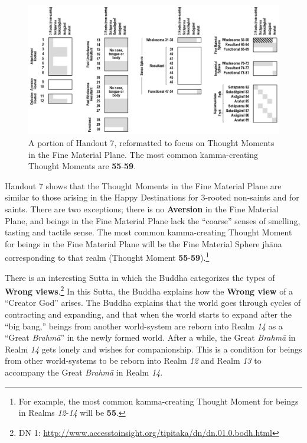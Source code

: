 \pagebreak

\begin{figure}[h]
\centering
\includegraphics[width=1\linewidth]{./Diagrams/Fine}
\caption{A portion of Handout 7, reformatted to focus on Thought Moments in the Fine Material Plane. The most common kamma-creating Thought Moments are \textbf{55}-\textbf{59}.}
\label{fig:Fine}
\end{figure}

Handout 7 shows that the Thought Moments in the Fine Material Plane are similar to those arising in the Happy Destinations for 3-rooted non-saints and for saints. There are two exceptions; there is no \textbf{Aversion} in the Fine Material Plane, and beings in the Fine Material Plane lack the “coarse” senses of smelling, tasting and tactile sense. The most common kamma-creating Thought Moment for beings in the Fine Material Plane will be the Fine Material Sphere jhāna corresponding to that realm (Thought Moment \textbf{55}-\textbf{59}).\footnote{For example, the most common kamma-creating Thought Moment for beings in Realms \textit{12}-\textit{14} will be \textbf{55}.}

There is an interesting Sutta in which the Buddha categorizes the types of \textbf{Wrong views}.\footnote{DN 1: \url{http://www.accesstoinsight.org/tipitaka/dn/dn.01.0.bodh.html}} In this Sutta, the Buddha explains how the \textbf{Wrong view} of a “Creator God” arises. The Buddha explains that the world goes through cycles of contracting and expanding, and that when the world starts to expand after the “big bang,” beings from another world-system are reborn into Realm \textit{14} as a “Great \textit{Brahmā}” in the newly formed world. After a while, the Great \textit{Brahmā} in Realm \textit{14} gets lonely and wishes for companionship. This is a condition for beings from other world-systems to be reborn into Realm \textit{12} and Realm \textit{13} to accompany the Great \textit{Brahmā} in Realm \textit{14}.

